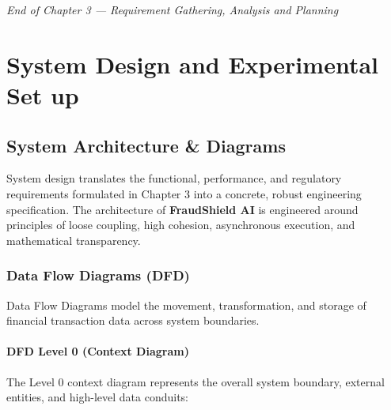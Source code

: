 \documentclass[12pt,a4paper,oneside]{report}
\begin{document}
\textit{End of Chapter 3 --- Requirement Gathering, Analysis and Planning}


\newpage


\chapter{System Design and Experimental Set up}

\section{System Architecture \& Diagrams}

System design translates the functional, performance, and regulatory requirements formulated in Chapter 3 into a concrete, robust engineering specification. The architecture of \textbf{FraudShield AI} is engineered around principles of loose coupling, high cohesion, asynchronous execution, and mathematical transparency.


\subsection{Data Flow Diagrams (DFD)}

Data Flow Diagrams model the movement, transformation, and storage of financial transaction data across system boundaries.


\subsubsection{DFD Level 0 (Context Diagram)}

The Level 0 context diagram represents the overall system boundary, external entities, and high-level data conduits:
\end{document}
